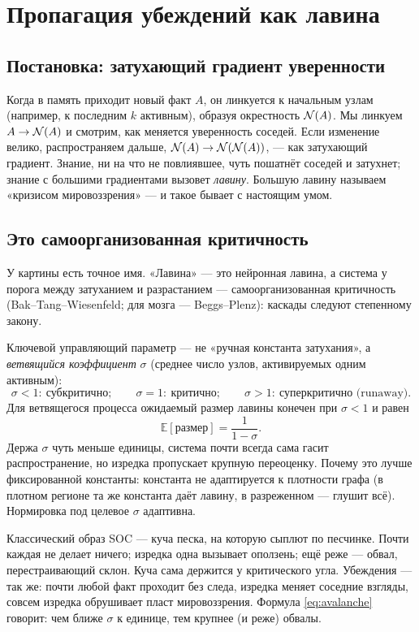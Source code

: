 \chapter{Пропагация убеждений как лавина}
\label{ch:propagation}

\section{Постановка: затухающий градиент уверенности}

Когда в память приходит новый факт $A$, он линкуется к начальным узлам
(например, к последним $k$ активным), образуя окрестность $\mathcal{N}(A)$. Мы
линкуем $A \to \mathcal{N}(A)$ и смотрим, как меняется уверенность соседей. Если
изменение велико, распространяем дальше,
$\mathcal{N}(A) \to \mathcal{N}(\mathcal{N}(A))$, --- как затухающий градиент. Знание, ни на
что не повлиявшее, чуть пошатнёт соседей и затухнет; знание с большими
градиентами вызовет \emph{лавину}. Большую лавину называем «кризисом
мировоззрения» --- и такое бывает с настоящим умом.

\section{Это самоорганизованная критичность}

У картины есть точное имя. «Лавина» --- это нейронная лавина, а система у
порога между затуханием и разрастанием --- самоорганизованная критичность
(Bak--Tang--Wiesenfeld; для мозга --- Beggs--Plenz): каскады следуют
степенному закону.

Ключевой управляющий параметр --- не «ручная константа затухания», а
\emph{ветвящийся коэффициент} $\sigma$ (среднее число узлов, активируемых
одним активным):
\[
\sigma < 1:\ \text{субкритично};\qquad
\sigma = 1:\ \text{критично};\qquad
\sigma > 1:\ \text{суперкритично (runaway)}.
\]
Для ветвящегося процесса ожидаемый размер лавины конечен при $\sigma < 1$ и
равен
\begin{equation}
\mathbb{E}[\text{размер}] = \frac{1}{1 - \sigma}.
\label{eq:avalanche}
\end{equation}
Держа $\sigma$ чуть меньше единицы, система почти всегда сама гасит
распространение, но изредка пропускает крупную переоценку. Почему это лучше
фиксированной константы: константа не адаптируется к плотности графа (в
плотном регионе та же константа даёт лавину, в разреженном --- глушит всё).
Нормировка под целевое $\sigma$ адаптивна.

\begin{intuition}
Классический образ SOC --- куча песка, на которую сыплют по песчинке. Почти
каждая не делает ничего; изредка одна вызывает оползень; ещё реже --- обвал,
перестраивающий склон. Куча сама держится у критического угла. Убеждения ---
так же: почти любой факт проходит без следа, изредка меняет соседние взгляды,
совсем изредка обрушивает пласт мировоззрения. Формула \eqref{eq:avalanche}
говорит: чем ближе $\sigma$ к единице, тем крупнее (и реже) обвалы.
\end{intuition}

